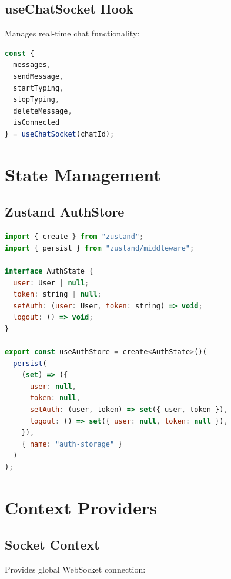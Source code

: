 \documentclass[12pt,a4paper]{report}
\begin{document}
\subsection{useChatSocket Hook}

Manages real-time chat functionality:

\begin{lstlisting}[language=JavaScript, caption=useChatSocket Hook]
const { 
  messages, 
  sendMessage, 
  startTyping, 
  stopTyping, 
  deleteMessage,
  isConnected 
} = useChatSocket(chatId);
\end{lstlisting}

\section{State Management}

\subsection{Zustand AuthStore}

\begin{lstlisting}[language=JavaScript, caption=AuthStore Implementation]
import { create } from "zustand";
import { persist } from "zustand/middleware";

interface AuthState {
  user: User | null;
  token: string | null;
  setAuth: (user: User, token: string) => void;
  logout: () => void;
}

export const useAuthStore = create<AuthState>()(
  persist(
    (set) => ({
      user: null,
      token: null,
      setAuth: (user, token) => set({ user, token }),
      logout: () => set({ user: null, token: null }),
    }),
    { name: "auth-storage" }
  )
);
\end{lstlisting}

\section{Context Providers}

\subsection{Socket Context}

Provides global WebSocket connection:
\end{document}
